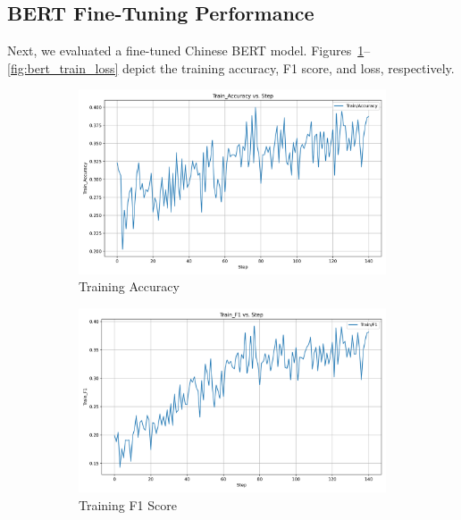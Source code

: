 \documentclass[12pt]{article}
\begin{document}
\subsection{BERT Fine-Tuning Performance}
Next, we evaluated a fine-tuned Chinese BERT model. Figures~\ref{fig:bert_train_acc}--\ref{fig:bert_train_loss} depict the training accuracy, F1 score, and loss, respectively.

\begin{figure}[ht]
\centering
\begin{subfigure}[b]{0.32\textwidth}
    \includegraphics[width=\linewidth]{BERT_Train_Accuracy.png}
    \caption{Training Accuracy}
    \label{fig:bert_train_acc}
\end{subfigure}
\hfill
\begin{subfigure}[b]{0.32\textwidth}
    \includegraphics[width=\linewidth]{BERT_Train_F1.png}
    \caption{Training F1 Score}
    \label{fig:bert_train_f1}
\end{subfigure}
\hfill
\begin{subfigure}[b]{0.32\textwidth}

\end{subfigure}
\end{figure}
\end{document}
